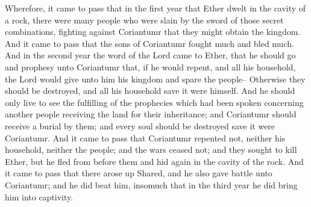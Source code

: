 \bverse \iffalse Wherefore, it came to pass that in the first year that Ether dwelt in the cavity of a rock, there were many people who were slain by the sword of those secret combinations, fighting against Coriantumr that they might obtain the kingdom. \fi
Wherefore, it came to pass that in the first year that Ether dwelt in the cavity of a rock, there were many people who were slain by the sword of those secret combinations, fighting against Coriantumr that they might obtain the kingdom.
\bverse \iffalse And it came to pass that the sons of Coriantumr fought much and bled much. \fi
And it came to pass that the sons of Coriantumr fought much and bled much.
\bverse \iffalse And in the second year the word of the Lord came to Ether, that he should go and prophesy unto Coriantumr that, if he would repent, and all his household, the Lord would give unto him his kingdom and spare the people-- \fi
And in the second year the word of the Lord came to Ether, that he should go and prophesy unto Coriantumr that, if he would repent, and all his household, the Lord would give unto him his kingdom and spare the people--
\bverse \iffalse Otherwise they should be destroyed, and all his household save it were himself. And he should only live to see the fulfilling of the prophecies which had been spoken concerning another people receiving the land for their inheritance; and Coriantumr should receive a burial by them; and every soul should be destroyed save it were Coriantumr. \fi
Otherwise they should be destroyed, and all his household save it were himself. And he should only live to see the fulfilling of the prophecies which had been spoken concerning another people receiving the land for their inheritance; and Coriantumr should receive a burial by them; and every soul should be destroyed save it were Coriantumr.
\bverse \iffalse And it came to pass that Coriantumr repented not, neither his household, neither the people; and the wars ceased not; and they sought to kill Ether, but he fled from before them and hid again in the cavity of the rock. \fi
And it came to pass that Coriantumr repented not, neither his household, neither the people; and the wars ceased not; and they sought to kill Ether, but he fled from before them and hid again in the cavity of the rock.
\bverse \iffalse And it came to pass that there arose up Shared, and he also gave battle unto Coriantumr; and he did beat him, insomuch that in the third year he did bring him into captivity. \fi
And it came to pass that there arose up Shared, and he also gave battle unto Coriantumr; and he did beat him, insomuch that in the third year he did bring him into captivity.
